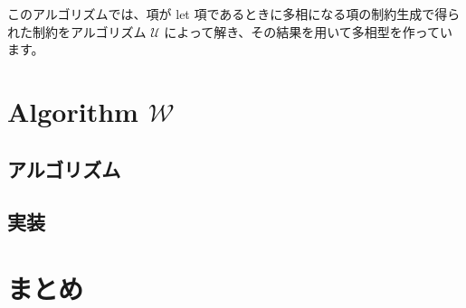 このアルゴリズムでは、項が let 項であるときに多相になる項の制約生成で得られた制約をアルゴリズム
$\mathcal U$ によって解き、その結果を用いて多相型を作っています。

\section{Algorithm $\mathcal W$}

\subsection{アルゴリズム}



\subsection{実装}



\section{まとめ}



